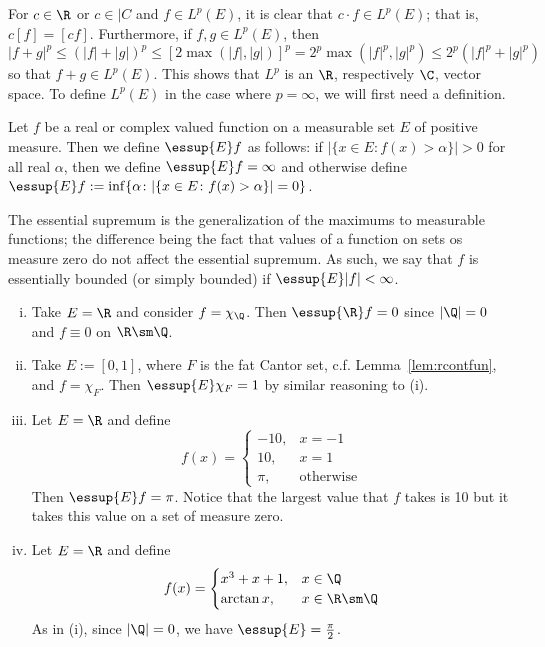 For $c \in \R$ or $c \in |C$ and $f \in L^p(E)$, it is clear that $c \cdot f \in L^p(E)$; that is, $c[f]= [cf]$. Furthermore, if $f,g \in L^p(E)$, then 
	\[
	|f+g|^p \leq (|f|+|g|)^p \leq [2 \max(|f|,|g|)]^p = 2^p \max(|f|^p,|g|^p) \leq 2^p(|f|^p+|g|^p)
	\]
so that $f+g \in L^p(E)$. This shows that $L^p$ is an $\R$, respectively $\C$, vector space. To define $L^p(E)$ in the case where $p=\infty$, we will first need a definition.


\begin{dfn}
Let $f$ be a real or complex valued function on a measurable set $E$ of positive measure. Then we define $\essup{E} f$ as follows: if $|\{ x \in E \colon f(x)>\alpha\}|>0$ for all real $\alpha$, then we define $\essup{E} f= \infty$ and otherwise define $\essup{E} f:= \inf\{ \alpha \colon |\{x \in E \colon f(x)>\alpha\}|=0 \}$. 
\end{dfn}


The essential supremum is the generalization of the maximums to measurable functions; the difference being the fact that values of a function on sets os measure zero do not affect the essential supremum. As such, we say that $f$ is essentially bounded (or simply bounded) if $\essup{E} |f|<\infty$. 


\begin{ex} \hfill
\begin{enumerate}[(i)]
\item Take $E=\R$ and consider $f= \chi_\Q$. Then $\essup{\R} f=0$ since $|\Q|=0$ and $f \equiv 0$ on $\R \sm \Q$. 
\item Take  $E:= [0,1]$, where $F$ is the fat Cantor set, c.f. Lemma~\ref{lem:rcontfun}, and $f= \chi_F$. Then $\essup{E} \chi_F=1$ by similar reasoning to (i). 
\item Let $E= \R$ and define
	\[
	f(x)=
	\begin{cases}
	-10, & x=-1 \\
	10, & x=1 \\
	\pi, & \text{otherwise}
	\end{cases}
	\]
Then $\essup{E} f= \pi$. Notice that the largest value that $f$ takes is 10 but it takes this value on a set of measure zero.
\item Let $E=\R$ and define
	\[
	f(x)= 
	\begin{cases}
	x^3+x+1, & x \in \Q \\
	\arctan x, & x \in \R\sm\Q
	\end{cases}
	\]
As in (i), since $|\Q|=0$, we have $\essup{E}= \frac{\pi}{2}$. 
\end{enumerate}
\end{ex} \xqed


